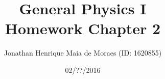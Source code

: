 \title{General Physics I \\ Homework Chapter 2}
\author{Jonathan Henrique Maia de Moraes (ID: 1620855)}
\date{02/??/2016}
\maketitle
